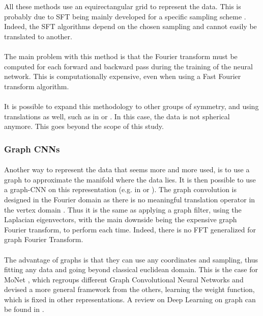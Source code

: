 \documentclass[11pt]{report}
\begin{document}
All these methods use an equirectangular grid to represent the data. This is probably due to SFT being mainly developed for a specific sampling scheme \cite{healy_ffts_2003}. Indeed, the SFT algorithms depend on the chosen sampling and cannot easily be translated to another.
\paragraph*{}
The main problem with this method is that the Fourier transform must be computed for each forward and backward pass during the training of the neural network. This is computationally expensive, even when using a Fast Fourier transform algorithm.

\paragraph*{}
It is possible to expand this methodology to other groups of symmetry, and using translations as well, such as in \cite{weiler_3d_2018} or \cite{worrall_cubenet:_2018}. In this case, the data is not spherical anymore. This goes beyond the scope of this study.
    
\subsubsection*{Graph CNNs}\label{sec:GCNN}
\paragraph*{}
Another way to represent the data that seems more and more used, is to use a graph to approximate the manifold where the data lies. It is then possible to use a graph-CNN on this representation (e.g. in \cite{bruna_spectral_2013} or \cite{masci_geodesic_2015}). The graph convolution is designed in the Fourier domain as there is no meaningful translation operator in the vertex domain \cite{defferrard_convolutional_2016}. Thus it is the same as applying a graph filter, using the Laplacian eigenvectors, with the main downside being the expensive graph Fourier transform, to perform each time. Indeed, there is no FFT generalized for graph Fourier Transform.
\paragraph*{}
The advantage of graphs is that they can use any coordinates and sampling, thus fitting any data and going beyond classical euclidean domain. This is the case for MoNet \cite{monti_geometric_2016}, which regroups different Graph Convolutional Neural Networks and devised a more general framework from the others, learning the weight function, which is fixed in other representations. A review on Deep Learning on graph can be found in \cite{bronstein_geometric_2017}.
\end{document}
